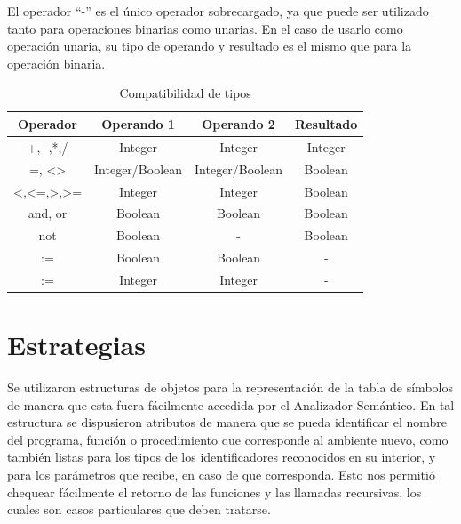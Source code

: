 El operador ``-'' es el único operador sobrecargado, ya que puede ser utilizado tanto para operaciones binarias como unarias. En el caso de usarlo como operación unaria, su tipo de operando y resultado es el mismo que para la operación binaria. 
\begin{table}[H]
\centering
\begin{tabular}{|c|c|c|c|}
\hline
Operador                                                & Operando 1      & Operando 2      & Resultado \\ \hline
+, -,*,/                                                & Integer         & Integer         & Integer   \\ \hline
=, \textless{}\textgreater{}                            & Integer/Boolean & Integer/Boolean & Boolean   \\ \hline
\textless{},\textless{}=,\textgreater{},\textgreater{}= & Integer         & Integer         & Boolean   \\ \hline
and, or                                                 & Boolean         & Boolean         & Boolean   \\ \hline
not                                                     & Boolean         & -               & Boolean   \\ \hline
:=                                                      & Boolean         & Boolean         & -         \\ \hline
:=                                                      & Integer         & Integer         & -         \\ \hline
\end{tabular}
\caption{Compatibilidad de tipos}
\label{tab:compatibilidad}
\end{table}

\section{Estrategias}
Se utilizaron estructuras de objetos para la representación de la tabla de símbolos de manera que esta fuera fácilmente accedida por el Analizador Semántico. En tal estructura se dispusieron atributos de manera que se pueda identificar el nombre del programa, función o procedimiento que corresponde al ambiente nuevo, como también listas para los tipos de los identificadores reconocidos en su interior, y para los parámetros que recibe, en caso de que corresponda. Esto nos permitió chequear fácilmente el retorno de las funciones y las llamadas recursivas, los cuales son casos particulares que deben tratarse.

